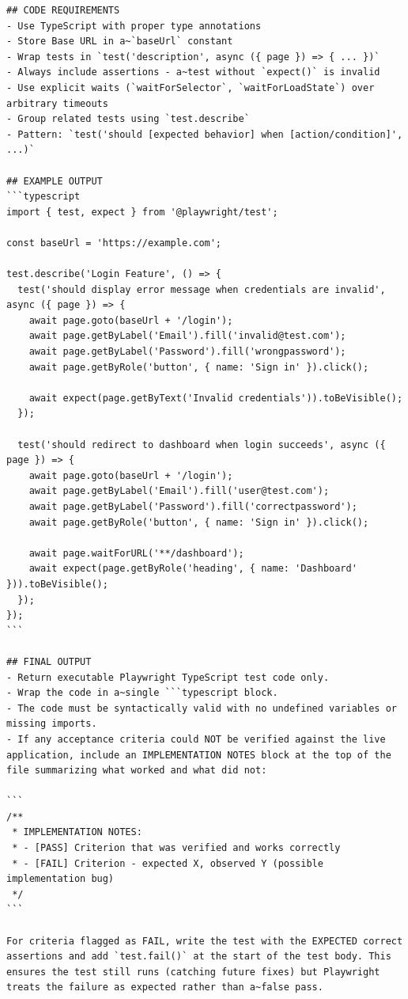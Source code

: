 \documentclass[czech, ing, kiv, he, iso690numb, viewonly]{fasthesis}
\begin{document}
\begin{lstlisting}
## CODE REQUIREMENTS
- Use TypeScript with proper type annotations
- Store Base URL in a~`baseUrl` constant
- Wrap tests in `test('description', async ({ page }) => { ... })`
- Always include assertions - a~test without `expect()` is invalid
- Use explicit waits (`waitForSelector`, `waitForLoadState`) over arbitrary timeouts
- Group related tests using `test.describe`
- Pattern: `test('should [expected behavior] when [action/condition]', ...)`

## EXAMPLE OUTPUT
```typescript
import { test, expect } from '@playwright/test';

const baseUrl = 'https://example.com';

test.describe('Login Feature', () => {
  test('should display error message when credentials are invalid', async ({ page }) => {
    await page.goto(baseUrl + '/login');
    await page.getByLabel('Email').fill('invalid@test.com');
    await page.getByLabel('Password').fill('wrongpassword');
    await page.getByRole('button', { name: 'Sign in' }).click();
    
    await expect(page.getByText('Invalid credentials')).toBeVisible();
  });

  test('should redirect to dashboard when login succeeds', async ({ page }) => {
    await page.goto(baseUrl + '/login');
    await page.getByLabel('Email').fill('user@test.com');
    await page.getByLabel('Password').fill('correctpassword');
    await page.getByRole('button', { name: 'Sign in' }).click();
    
    await page.waitForURL('**/dashboard');
    await expect(page.getByRole('heading', { name: 'Dashboard' })).toBeVisible();
  });
});
```

## FINAL OUTPUT
- Return executable Playwright TypeScript test code only.
- Wrap the code in a~single ```typescript block.
- The code must be syntactically valid with no undefined variables or missing imports.
- If any acceptance criteria could NOT be verified against the live application, include an IMPLEMENTATION NOTES block at the top of the file summarizing what worked and what did not:

```
/**
 * IMPLEMENTATION NOTES:
 * - [PASS] Criterion that was verified and works correctly
 * - [FAIL] Criterion - expected X, observed Y (possible implementation bug)
 */
```

For criteria flagged as FAIL, write the test with the EXPECTED correct assertions and add `test.fail()` at the start of the test body. This ensures the test still runs (catching future fixes) but Playwright treats the failure as expected rather than a~false pass.
\end{lstlisting}
\end{document}
